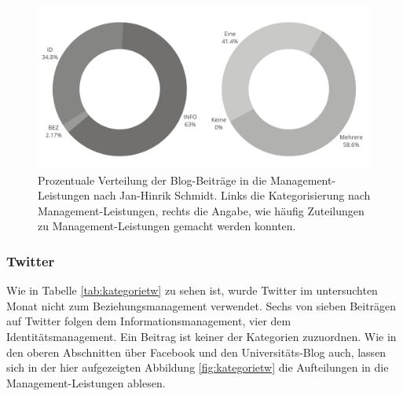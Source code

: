 \begin{figure}[H]
    \centering
    \includegraphics[width=.9\textwidth]{img/plots/kat/kat_bl.png}
    \caption{Prozentuale Verteilung der Blog-Beiträge in die Management-Leistungen nach Jan-Hinrik Schmidt. Links die Kategorisierung nach Management-Leistungen, rechts die Angabe, wie häufig Zuteilungen zu Management-Leistungen gemacht werden konnten.}
    \label{fig:kategoriebl}
\end{figure}  

\subsubsection{Twitter}

Wie in Tabelle \ref{tab:kategorietw} zu sehen ist, wurde Twitter im untersuchten Monat nicht zum Beziehungsmanagement verwendet. Sechs von sieben Beiträgen auf Twitter folgen dem Informationsmanagement, vier dem Identitätsmanagement. Ein Beitrag ist keiner der Kategorien zuzuordnen. Wie in den oberen Abschnitten über Facebook und den Universitäts-Blog auch, lassen sich in der hier aufgezeigten Abbildung \ref{fig:kategorietw} die Aufteilungen in die Management-Leistungen ablesen. 

\begin{table}[h]
    \caption{Blog Beiträge der Universität Bielefeld im Juli 2018 und ihre Zuordnung zu den Management-Leistungen nach Schmidt.}
\label{tab:kategorietw}
\end{table}

